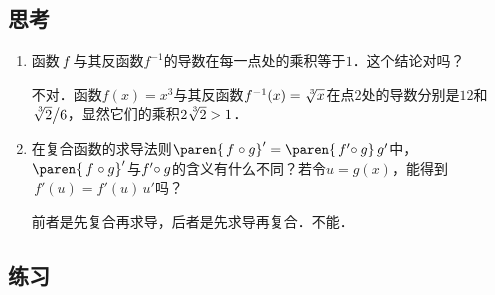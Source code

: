 \subsection*{思考}

\begin{enumerate}
\item 函数\(\,f\mkern2mu\)与其反函数\(f^{-1}\)的导数在每一点处的乘积等于\(1\)．这个结论对吗？

  \ifshowsolp
    不对．函数\(f(x) = x^3\!\)与其反函数\(f^{-1}(x) = \sqrt[\leftroot{-2}\uproot{2}3]x\)在点\(2\)处的导数分别是\(12\)和\(\sqrt[\leftroot{-2}\uproot{2}3]{2}\big/{6}\)，显然它们的乘积\(2\sqrt[\leftroot{-2}\uproot{2}3]2 > 1\)．
  \fi

\item 在复合函数的求导法则\(\paren{\,f\mkern1mu \circ g}' = \paren{\,f'\mkern-4mu \circ g}\,g'\)中，\(\paren{\,f\mkern1mu \circ g}'\)与\(f'\mkern-4mu \circ g\)的含义有什么不同？若令\(u = g(x)\)，能得到\(\,f'(u) = f'(u)\,u'\)吗？

  \ifshowsolp
    前者是先复合再求导，后者是先求导再复合．不能．
  \fi
\end{enumerate}

\ifshowex
{}
\subsection*{练习}

